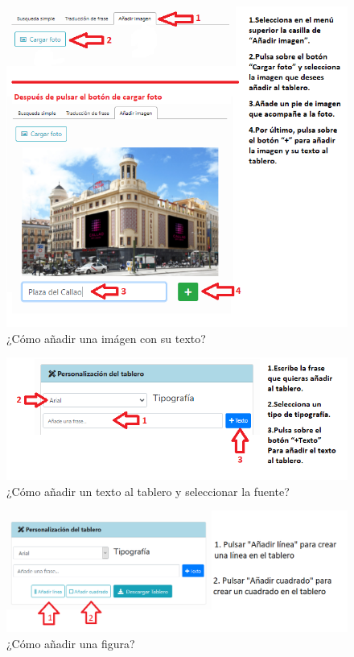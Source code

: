 \begin{figure}[h!]
	\centering
	\includegraphics[width=\linewidth]{Imagenes/Bitmap/Tarea4-Pista1}
	\caption{¿Cómo añadir una imágen con su texto?}
	\label{fig:tarea4-pista1}
\end{figure}

\begin{figure}[h!]
	\centering
	\includegraphics[width=\linewidth]{Imagenes/Bitmap/Tarea4-Pista2}
	\caption{¿Cómo añadir un texto al tablero y seleccionar la fuente?}
	\label{fig:tarea4-pista2}
\end{figure}


\begin{figure}[h!]
	\centering
	\includegraphics[width=\linewidth]{Imagenes/Bitmap/Tarea4-Pista3}
	\caption{¿Cómo añadir una figura?}
	\label{fig:tarea4-pista3}
\end{figure}



